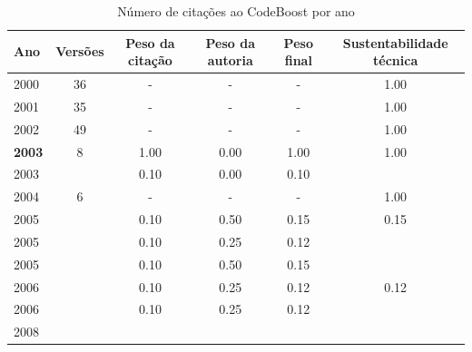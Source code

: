 \begin{table}[H]
\caption{Número de citações ao CodeBoost por ano}
\centering
\begin{tabular}{| l | c | c | c | c | c |}
  \hline
  Ano & Versões & Peso da citação & Peso da autoria & Peso final & Sustentabilidade técnica \\
  \hline
        2000 & 36 & - & - & -
        &
          {\color{blue} 1.00}
        \\
\hline
        2001 & 35 & - & - & -
        &
          {\color{blue} 1.00}
        \\
\hline
        2002 & 49 & - & - & -
        &
          {\color{blue} 1.00}
        \\
\hline
            {\bf 2003}
          &
          8
          &
          1.00
          &
          0.00
          &
          1.00
          &
            {\color{blue} 1.00}
          \\
            2003
          &
          
          &
          0.10
          &
          0.00
          &
          0.10
          &
          \\
\hline
        2004 & 6 & - & - & -
        &
          {\color{blue} 1.00}
        \\
\hline
            2005
          &
          
          &
          0.10
          &
          0.50
          &
          0.15
          &
            {\color{red} 0.15}
          \\
            2005
          &
          
          &
          0.10
          &
          0.25
          &
          0.12
          &
          \\
            2005
          &
          
          &
          0.10
          &
          0.50
          &
          0.15
          &
          \\
\hline
            2006
          &
          
          &
          0.10
          &
          0.25
          &
          0.12
          &
            {\color{red} 0.12}
          \\
            2006
          &
          
          &
          0.10
          &
          0.25
          &
          0.12
          &
          \\
\hline
            2008
          &
          

\end{tabular}
\end{table}
